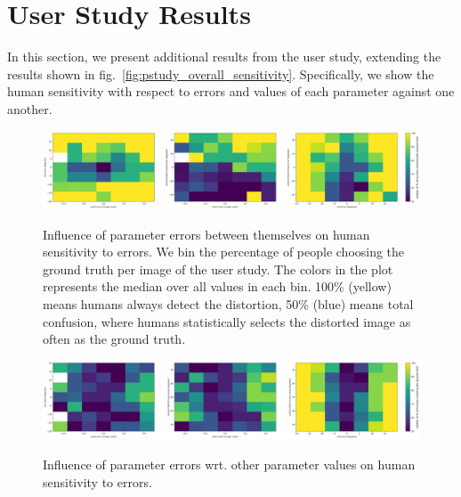 \clearpage

\FloatBarrier

\protect\hypertarget{studyresults}{}{}

\hypertarget{user-study-results}{%
\section{User Study Results}\label{user-study-results}}

In this section, we present additional results from the user study,
extending the results shown in fig.~\ref{fig:pstudy_overall_sensitivity}. Specifically, we show the human
sensitivity with respect to errors and values of each parameter against
one another.

\begin{figure}[!ht]
\centering
\includegraphics[width=\linewidth]{study_results/hist2d_image_units_error_error.png}\\
\caption[Influence of parameter errors on human sensitivity]{Influence of parameter errors between themselves on human
sensitivity to errors. We bin the percentage of people choosing the
ground truth per image of the user study. The colors in the plot
represents the median over all values in each bin. 100\% (yellow) means
humans always detect the distortion, 50\% (blue) means total confusion,
where humans statistically selects the distorted image as often as the
ground truth.}
\end{figure}

\begin{figure}[!ht]
\centering
\includegraphics[width=\linewidth]{study_results/hist2d_image_units_error_value.png}\\
\caption[Influence of parameter errors wrt. other parameter values on human sensitivity]{Influence of parameter errors wrt. other parameter values on
human sensitivity to errors.}
\end{figure}

